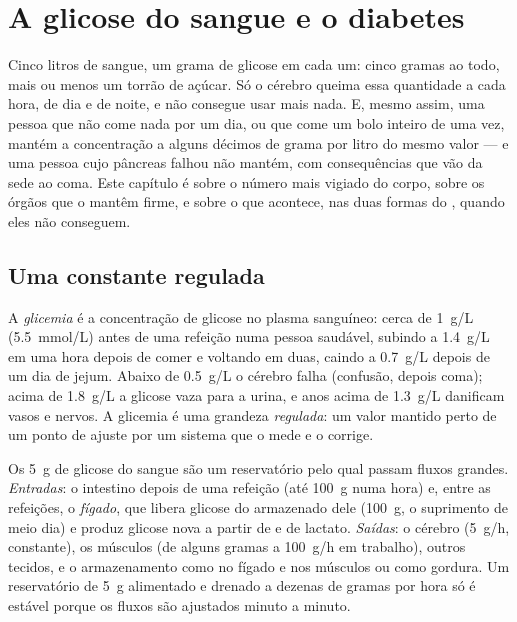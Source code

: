 \chapter{A glicose do sangue e o diabetes}\label{ch:g12:glucose-and-diabetes}

Cinco litros de sangue, um grama de glicose em cada um: cinco gramas ao
todo, mais ou menos um torrão de açúcar. Só o cérebro queima essa
quantidade a cada hora, de dia e de noite, e não consegue usar mais
nada. E, mesmo assim, uma pessoa que não come nada por um dia, ou que
come um bolo inteiro de uma vez, mantém a concentração a alguns décimos
de grama por litro do mesmo valor --- e uma pessoa cujo pâncreas falhou
não mantém, com consequências que vão da sede ao coma. Este capítulo é
sobre o número mais vigiado do corpo, sobre os órgãos que o mantêm
firme, e sobre o que acontece, nas duas formas do , quando eles não conseguem.

\section{Uma constante regulada}

\begin{definition}[Glicemia]\label{def:g12:glucose-and-diabetes:glycaemia}
A \emph{glicemia} é a concentração de glicose no plasma
sanguíneo: cerca de \qty{1}{g/L} (\qty{5.5}{mmol/L}) antes de uma
refeição numa pessoa saudável, subindo a \qty{1.4}{g/L} em uma hora
depois de comer e voltando em duas, caindo a \qty{0.7}{g/L} depois de
um dia de jejum. Abaixo de \qty{0.5}{g/L} o cérebro falha (confusão,
depois coma); acima de \qty{1.8}{g/L} a glicose vaza para a urina, e
anos acima de \qty{1.3}{g/L} danificam vasos e nervos. A glicemia é uma
grandeza \emph{regulada}: um valor mantido perto de um ponto de
ajuste por um sistema que o mede e o corrige.
\end{definition}

\begin{proposition}\label{prop:g12:glucose-and-diabetes:pool}
Os \qty{5}{g} de glicose do sangue são um reservatório pelo qual passam
fluxos grandes. \emph{Entradas}: o intestino depois de uma refeição
(até \qty{100}{g} numa hora) e, entre as refeições, o \emph{fígado},
que libera glicose do \emph{} armazenado dele (\qty{100}{g},
o suprimento de meio dia) e produz glicose nova a partir de 
e de lactato. \emph{Saídas}: o cérebro (\qty{5}{g/h}, constante), os
músculos (de alguns gramas a \qty{100}{g/h} em trabalho), outros
tecidos, e o armazenamento como  no fígado e nos músculos ou
como gordura. Um reservatório de \qty{5}{g} alimentado e drenado a
dezenas de gramas por hora só é estável porque os fluxos são ajustados
minuto a minuto.
\end{proposition}
\admitted

